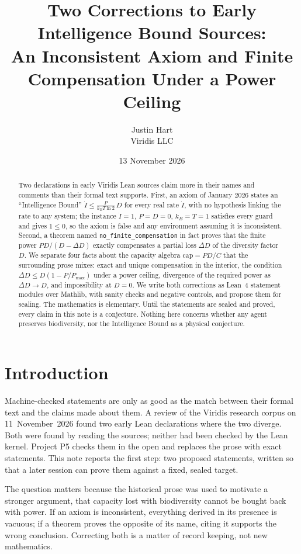 \documentclass[11pt]{article}
\title{Two Corrections to Early Intelligence Bound Sources:\\
An Inconsistent Axiom and Finite Compensation Under a Power Ceiling}
\author{Justin Hart\\Viridis LLC}
\date{13 November 2026}
\theoremstyle{remark}
\begin{document}
\maketitle

\begin{abstract}
Two declarations in early Viridis Lean sources claim more in their names and comments than
their formal text supports. First, an axiom of January 2026 states an ``Intelligence Bound''
$\dot I \le \frac{P}{k_B T\ln 2}\,D$ for every real rate $\dot I$, with no hypothesis linking the
rate to any system; the instance $\dot I=1$, $P=D=0$, $k_B=T=1$ satisfies every guard and gives
$1\le 0$, so the axiom is false and any environment assuming it is inconsistent. Second, a
theorem named \texttt{no\_finite\_compensation} in fact proves that the finite power
$P D/(D-\Delta D)$ exactly compensates a partial loss $\Delta D$ of the diversity factor $D$. We
separate four facts about the capacity algebra $\mathrm{cap}=PD/C$ that the surrounding prose
mixes: exact and unique compensation in the interior, the condition
$\Delta D\le D(1-P/P_{\max})$ under a power ceiling, divergence of the required power as
$\Delta D\to D$, and impossibility at $D=0$. We write both corrections as Lean~4 statement
modules over Mathlib, with sanity checks and negative controls, and propose them for sealing.
The mathematics is elementary. Until the statements are sealed and proved, every claim in this
note is a conjecture. Nothing here concerns whether any agent preserves biodiversity, nor the
Intelligence Bound as a physical conjecture.
\end{abstract}

\section{Introduction}
Machine-checked statements are only as good as the match between their formal text and the
claims made about them. A review of the Viridis research corpus on 11~November~2026 found two
early Lean declarations where the two diverge. Both were found by reading the sources; neither
had been checked by the Lean kernel. Project P5 checks them in the open and replaces the prose
with exact statements. This note reports the first step: two proposed statements, written so
that a later session can prove them against a fixed, sealed target.

The question matters because the historical prose was used to motivate a stronger argument,
that capacity lost with biodiversity cannot be bought back with power. If an axiom is
inconsistent, everything derived in its presence is vacuous; if a theorem proves the opposite of
its name, citing it supports the wrong conclusion. Correcting both is a matter of record keeping,
not new mathematics.
\end{document}
